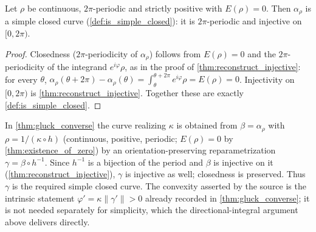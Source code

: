 \begin{corollary}

  \label{cor:positive_curvature_implies_simple}
  Let $\rho$ be continuous, $2\pi$-periodic and strictly positive with $E(\rho) =
  0$. Then $\alpha_\rho$ is a simple closed curve (\cref{def:is_simple_closed}):
  it is $2\pi$-periodic and injective on $[0, 2\pi)$.
\end{corollary}
\begin{proof}
  \leanok
  Closedness ($2\pi$-periodicity of $\alpha_\rho$) follows from $E(\rho) = 0$ and
  the $2\pi$-periodicity of the integrand $e^{i\varphi}\rho$, as in the proof of
  \cref{thm:reconstruct_injective}: for every $\theta$, $\alpha_\rho(\theta +
  2\pi) - \alpha_\rho(\theta) = \int_\theta^{\theta + 2\pi} e^{i\varphi}\rho =
  E(\rho) = 0$. Injectivity on $[0, 2\pi)$ is \cref{thm:reconstruct_injective}.
  Together these are exactly \cref{def:is_simple_closed}.
\end{proof}

\begin{remark}
  In \cref{thm:gluck_converse} the curve realizing $\kappa$ is obtained from
  $\beta = \alpha_\rho$ with $\rho = 1/(\kappa\circ h)$ (continuous, positive,
  periodic; $E(\rho)=0$ by \cref{thm:existence_of_zero}) by an
  orientation-preserving reparametrization $\gamma = \beta\circ h^{-1}$. Since
  $h^{-1}$ is a bijection of the period and $\beta$ is injective on it
  (\cref{thm:reconstruct_injective}), $\gamma$ is injective as well; closedness is
  preserved. Thus $\gamma$ is the required simple closed curve. The convexity
  asserted by the source is the intrinsic statement $\varphi' = \kappa\lVert
  \gamma'\rVert > 0$ already recorded in \cref{thm:gluck_converse}; it is not
  needed separately for simplicity, which the directional-integral argument above
  delivers directly.
\end{remark}
